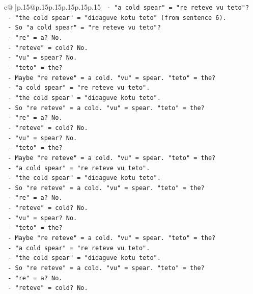 \documentclass{article}
\begin{document}
{\begin{supertabular}{c@{$\;$}|p{.15\linewidth}@{}p{.15\linewidth}p{.15\linewidth}p{.15\linewidth}p{.15\linewidth}p{.15\linewidth}}
{{{\texttt{   {-} "a cold spear" = "re reteve vu teto"?} \\
\texttt{   {-} "the cold spear" = "didaguve kotu teto" (from sentence 6).} \\
\texttt{   {-} So "a cold spear" = "re reteve vu teto"?} \\
\texttt{   {-} "re" = a? No.} \\
\texttt{   {-} "reteve" = cold? No.} \\
\texttt{   {-} "vu" = spear? No.} \\
\texttt{   {-} "teto" = the?} \\
\texttt{   {-} Maybe "re reteve" = a cold. "vu" = spear. "teto" = the?} \\
\texttt{   {-} "a cold spear" = "re reteve vu teto".} \\
\texttt{   {-} "the cold spear" = "didaguve kotu teto".} \\
\texttt{   {-} So "re reteve" = a cold. "vu" = spear. "teto" = the?} \\
\texttt{   {-} "re" = a? No.} \\
\texttt{   {-} "reteve" = cold? No.} \\
\texttt{   {-} "vu" = spear? No.} \\
\texttt{   {-} "teto" = the?} \\
\texttt{   {-} Maybe "re reteve" = a cold. "vu" = spear. "teto" = the?} \\
\texttt{   {-} "a cold spear" = "re reteve vu teto".} \\
\texttt{   {-} "the cold spear" = "didaguve kotu teto".} \\
\texttt{   {-} So "re reteve" = a cold. "vu" = spear. "teto" = the?} \\
\texttt{   {-} "re" = a? No.} \\
\texttt{   {-} "reteve" = cold? No.} \\
\texttt{   {-} "vu" = spear? No.} \\
\texttt{   {-} "teto" = the?} \\
\texttt{   {-} Maybe "re reteve" = a cold. "vu" = spear. "teto" = the?} \\
\texttt{   {-} "a cold spear" = "re reteve vu teto".} \\
\texttt{   {-} "the cold spear" = "didaguve kotu teto".} \\
\texttt{   {-} So "re reteve" = a cold. "vu" = spear. "teto" = the?} \\
\texttt{   {-} "re" = a? No.} \\
\texttt{   {-} "reteve" = cold? No.} \\
}}}
\end{supertabular}}
\end{document}
